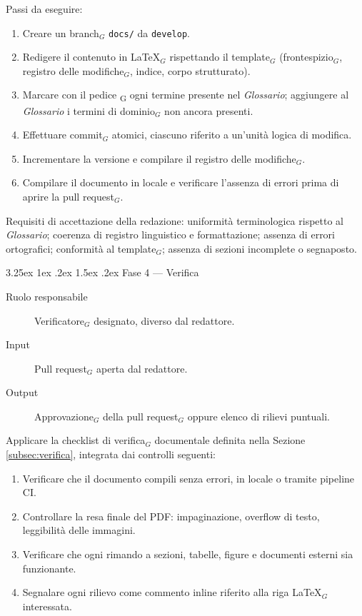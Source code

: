 \documentclass[a4paper, 10pt]{article}
\makeatletter
\renewcommand\paragraph{\@startsection{paragraph}{4}{\z@}%
  {3.25ex \@plus1ex \@minus .2ex}%
  {1.5ex \@plus .2ex}%
  {\normalfont\normalsize\bfseries}}
\makeatother
\begin{document}
\noindent Passi da eseguire:
\begin{enumerate}
    \item Creare un branch$_G$ \texttt{docs/} da \texttt{develop}.
    \item Redigere il contenuto in \LaTeX$_G$ rispettando il template$_G$ (frontespizio$_G$, registro delle modifiche$_G$, indice, corpo strutturato).
    \item Marcare con il pedice \textsubscript{G} ogni termine presente nel \emph{Glossario}; aggiungere al \emph{Glossario} i termini di dominio$_G$ non ancora presenti.
    \item Effettuare commit$_G$ atomici, ciascuno riferito a un'unità logica di modifica.
    \item Incrementare la versione e compilare il registro delle modifiche$_G$.
    \item Compilare il documento in locale e verificare l'assenza di errori prima di aprire la pull request$_G$.
\end{enumerate}

\noindent Requisiti di accettazione della redazione: uniformità terminologica rispetto al \emph{Glossario}; coerenza di registro linguistico e formattazione; assenza di errori ortografici; conformità al template$_G$; assenza di sezioni incomplete o segnaposto.

\paragraph{Fase 4 --- Verifica}

\begin{description}
    \item[Ruolo responsabile] Verificatore$_G$ designato, diverso dal redattore.
    \item[Input] Pull request$_G$ aperta dal redattore.
    \item[Output] Approvazione$_G$ della pull request$_G$ oppure elenco di rilievi puntuali.
\end{description}

\noindent Applicare la checklist di verifica$_G$ documentale definita nella Sezione \ref{subsec:verifica}, integrata dai controlli seguenti:
\begin{enumerate}
    \item Verificare che il documento compili senza errori, in locale o tramite pipeline CI.
    \item Controllare la resa finale del PDF: impaginazione, overflow di testo, leggibilità delle immagini.
    \item Verificare che ogni rimando a sezioni, tabelle, figure e documenti esterni sia funzionante.
    \item Segnalare ogni rilievo come commento inline riferito alla riga \LaTeX$_G$ interessata.
\end{enumerate}
\end{document}
